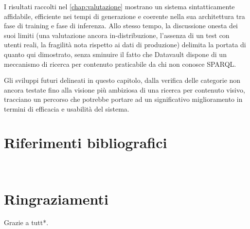 \documentclass[12pt,a4paper,oneside]{book}
\begin{document}
I risultati raccolti nel \cref{chap:valutazione} mostrano un sistema sintatticamente affidabile, efficiente nei tempi di generazione e coerente nella sua architettura tra fase di training e fase di inferenza. Allo stesso tempo, la discussione onesta dei suoi limiti (una valutazione ancora in-distribuzione, l'assenza di un test con utenti reali, la fragilità nota rispetto ai dati di produzione) delimita la portata di quanto qui dimostrato, senza sminuire il fatto che Datavault dispone di un meccanismo di ricerca per contenuto praticabile da chi non conosce SPARQL.\@

Gli sviluppi futuri delineati in questo capitolo, dalla verifica delle categorie non ancora testate fino alla visione più ambiziosa di una ricerca per contenuto visivo, tracciano un percorso che potrebbe portare ad un significativo miglioramento in termini di efficacia e usabilità del sistema. 










\renewcommand{\bibsection}{}
\chapter*{Riferimenti bibliografici}
\nocite{*}   
\newpage




\newpage~\newpage
\chapter*{Ringraziamenti}
Grazie a tutt*.
\end{document}
